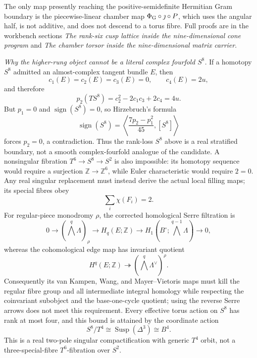 \documentclass[10pt,letterpaper]{article}
\begin{document}
The only map presently reaching the positive-semidefinite Hermitian Gram
boundary is the piecewise-linear chamber map
\(\Phi_{\rm G}\circ\jmath\circ P\), which uses the angular half, is not
additive, and does not descend to a torus fibre.  Full proofs are in the
workbench sections \emph{The rank-six cusp lattice inside the
nine-dimensional cone program} and \emph{The chamber torsor inside the
nine-dimensional matrix carrier}.

\medskip\noindent
\textit{Why the higher-rung object cannot be a literal complex
fourfold \(S^8\).}
If a homotopy \(S^8\) admitted an almost-complex tangent bundle \(E\), then
\[
 c_1(E)=c_2(E)=c_3(E)=0,\qquad c_4(E)=2u,
\]
and therefore
\[
 p_2(TS^8)=c_2^2-2c_1c_3+2c_4=4u.
\]
But \(p_1=0\) and \(\operatorname{sign}(S^8)=0\), so Hirzebruch's formula
\[
 \operatorname{sign}(S^8)
 =\left\langle\frac{7p_2-p_1^2}{45},[S^8]\right\rangle
\]
forces \(p_2=0\), a contradiction.  Thus the rank-loss \(S^8\) above is a
real stratified boundary, not a smooth complex-fourfold analogue of the
candidate.  A nonsingular fibration \(T^6\to S^8\to S^2\) is also
impossible: its homotopy sequence would require a surjection
\(\mathbb Z\to\mathbb Z^6\), while Euler characteristic would require
\(2=0\).  Any real singular replacement must instead derive the actual
local filling maps; its special fibres obey
\[
 \sum_i\chi(F_i)=2.
\]
For regular-piece monodromy \(\rho\), the corrected homological Serre
filtration is
\[
 0\longrightarrow(\textstyle\bigwedge^q\Lambda)_\rho
 \longrightarrow H_q(E;\mathbb Z)
 \longrightarrow
 H_1(B^\circ;\textstyle\bigwedge^{q-1}\Lambda)
 \longrightarrow0,
\]
whereas the cohomological edge map has invariant quotient
\[
 H^q(E;\mathbb Z)\twoheadrightarrow
 (\textstyle\bigwedge^q\Lambda^\vee)^\rho.
\]
Consequently its van Kampen, Wang, and Mayer--Vietoris maps must kill the
regular fibre group and all intermediate integral homology while
respecting the coinvariant subobject and the base-one-cycle quotient;
using the reverse Serre arrows does not meet this requirement.
Every effective torus action on \(S^8\) has rank at most four, and this bound
is attained by the coordinate action
\[
 S^8/T^4\cong\operatorname{Susp}(\Delta^3)\cong B^4.
\]
This is a real two-pole singular compactification with generic \(T^4\)
orbit, not a three-special-fibre \(T^6\)-fibration over \(S^2\).
\end{document}
